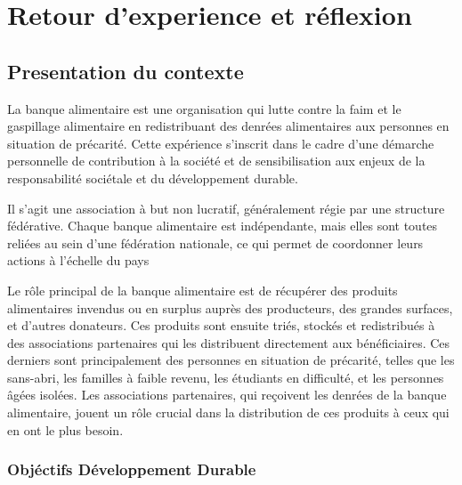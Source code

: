 \documentclass[11pt, openright]{book}
\begin{document}


    \thispagestyle{head}

     \section*{Retour d'experience et réflexion}

      \subsection*{Presentation du contexte}

      La banque alimentaire est une organisation qui lutte contre la faim et le gaspillage alimentaire en redistribuant des denrées alimentaires aux personnes en situation de précarité. Cette expérience s'inscrit dans le cadre d'une démarche personnelle de contribution à la société et de sensibilisation aux enjeux de la responsabilité sociétale et du développement durable.

      Il s'agit une association à but non lucratif, généralement régie par une structure fédérative. Chaque banque alimentaire est indépendante, mais elles sont toutes reliées au sein d'une fédération nationale, ce qui permet de coordonner leurs actions à l'échelle du pays

      Le rôle principal de la banque alimentaire est de récupérer des produits alimentaires invendus ou en surplus auprès des producteurs, des grandes surfaces, et d'autres donateurs. Ces produits sont ensuite triés, stockés et redistribués à des associations partenaires qui les distribuent directement aux bénéficiaires. Ces derniers sont principalement des personnes en situation de précarité, telles que les sans-abri, les familles à faible revenu, les étudiants en difficulté, et les personnes âgées isolées. Les associations partenaires, qui reçoivent les denrées de la banque alimentaire, jouent un rôle crucial dans la distribution de ces produits à ceux qui en ont le plus besoin.

       \subsubsection*{Objéctifs Développement Durable}
\end{document}
